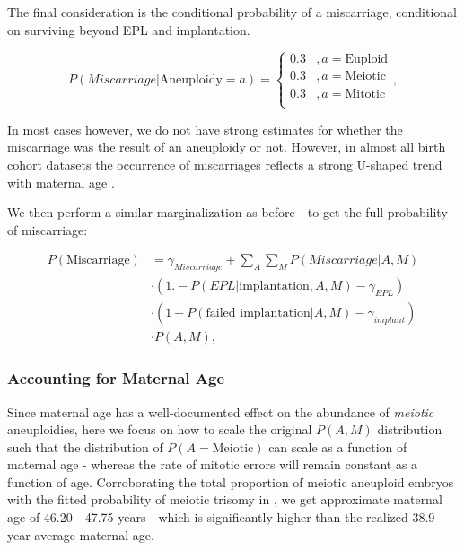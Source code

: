 \documentclass{article}
\begin{document}
The final consideration is the conditional probability of a miscarriage, conditional on surviving beyond EPL and implantation. 

\begin{equation}
	P(Miscarriage | \text{Aneuploidy}=a) = \begin{cases}
	0.3 &, a= \text{Euploid}\\
	0.3 &, a = \text{Meiotic}\\
	0.3 &, a = \text{Mitotic}\\
	\end{cases},
\end{equation}

In most cases however, we do not have strong estimates for whether the miscarriage was the result of an aneuploidy or not. However, in almost all birth cohort datasets the occurrence of miscarriages reflects a strong U-shaped trend  with maternal age \citep{Gruhn2019-al}. 

We then perform a similar marginalization as before - to get the full probability of miscarriage: 

\begin{equation}
\begin{aligned}
P(\text{Miscarriage}) &=  \gamma_{Miscarriage} + \sum_{A}\sum_{M} P(Miscarriage | A,M)\\
&\cdot (1. - P(EPL | \text{implantation}, A, M) - \gamma_{EPL})\\
&\cdot (1 - P(\text{failed implantation} | A, M) - \gamma_{implant})\\ 
&\cdot P(A, M),
\end{aligned}
\end{equation}


\subsubsection*{Accounting for Maternal Age} 

Since maternal age has a well-documented effect on the abundance of \textit{meiotic} aneuploidies, here we focus on how to scale the original $P(A,M)$ distribution such that the distribution of $P(A = \text{Meiotic})$ can scale as a function of maternal age - whereas the rate of mitotic errors will remain constant as a function of age. Corroborating the total proportion of meiotic aneuploid embryos with the fitted probability of meiotic trisomy in \citep{Gruhn2019-al}, we get approximate maternal age of 46.20 - 47.75 years - which is significantly higher than the realized 38.9 year average maternal age. 
\end{document}
